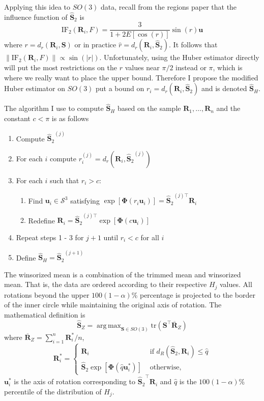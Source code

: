 \documentclass{article}\usepackage[]{graphicx}\usepackage[]{color}
\DeclareMathOperator*{\argmax}{arg\,max}
\newcommand{\ProjMean}{{\widehat{\bm S}_{2}}}
\newcommand{\HuberMean}{{\widehat{\bm S}_H}}
\newcommand{\WinzMean}{{\widehat{\bm S}_Z}}
\begin{document}
Applying this idea to $SO(3)$ data, recall from the regions paper that the influence function of $\ProjMean$ is
\[
\text{IF}_2(\bm R_i,F)=\frac{3}{1+2E[\cos(r)]}\sin(r)\bm u
\]
where $r=d_r(\bm R_i,\bm S)$ or in practice $\hat{r}=d_r(\bm R_i,\ProjMean)$.  It follows that $\|\text{IF}_2(\bm R_i,F)\|\propto \sin(|r|)$.  Unfortunately, using the Huber estimator directly will put the most restrictions on the $r$ values near $\pi/2$ instead or $\pi$, which is where we really want to place the upper bound.  Therefore I propose the modified Huber estimator on $SO(3)$ put a bound on $r_i=d_r(\bm R_i,\ProjMean)$ and is denoted $\HuberMean$.  

The algorithm I use to compute $\HuberMean$ based on the sample $\bm R_1,\dots,\bm R_n$ and the constant $c<\pi$ is as follows
\begin{enumerate} 
\item Compute $\ProjMean^{(j)}$
\item For each $i$ compute $r_i^{(j)}=d_r(\bm R_i,\ProjMean^{(j)})$
\item For each $i$ such that $r_i>c$:
\begin{enumerate}
\item Find $\bm u_i\in\mathcal{S}^3$ satisfying $\exp[\bm{\Phi}(r_i\bm u_i)]=\ProjMean^{(j)\top}\bm R_i$
\item Redefine $\bm R_i=\ProjMean^{(j)\top}\exp[\bm{\Phi}(c\bm u_i)]$
\end{enumerate}
\item Repeat steps 1 - 3 for $j+1$ until $r_i<c$ for all $i$
\item Define $\HuberMean=\ProjMean^{(j+1)}$
\end{enumerate}

The winsorized mean is a combination of the trimmed mean and winsorized mean.  That is, the data are ordered according to their respective $H_j$ values.  All rotations beyond the upper $100(1-\alpha)$\% percentage is projected to the border of the inner circle while maintaining the original axis of rotation.  The mathematical definition is 
\[
\WinzMean=\argmax_{\bm S\in SO(3)}\text{tr}(\bm S^\top\overline{\bm R}_{Z})
\]
where $\overline{\bm R}_{Z}=\sum_{i=1}^n\bm R_i^*/n$, 
\[
\bm R_i^*=
\begin{cases}
\bm R_i&\text{ if }d_R(\ProjMean,\bm R_i)\leq\hat{q}\\
\ProjMean\exp[\bm{\Phi}(\hat{q}\bm{u}_i^*)]&\text{ otherwise,}
\end{cases}
\]
$\bm u_i^*$ is the axis of rotation corresponding to $\ProjMean^\top\bm R_i$ and $\hat{q}$ is the $100(1-\alpha)$\% percentile of the distribution of $H_j$.
\end{document}
